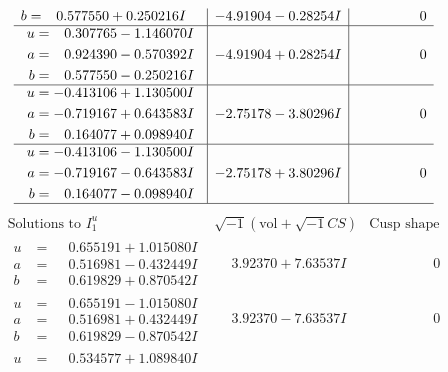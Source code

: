\documentclass[1p]{elsarticle_modified}
\theoremstyle{definition}
\newcommand{\I}{\sqrt{-1}}
\begin{document}
$$\begin{array}{c|c|c}
\begin{aligned}
b &= \phantom{-}0.577550 + 0.250216 I\end{aligned}
 & -4.91904 - 0.28254 I & \phantom{-0.000000 } 0 \\ \hline\begin{aligned}
u &= \phantom{-}0.307765 - 1.146070 I \\
a &= \phantom{-}0.924390 - 0.570392 I \\
b &= \phantom{-}0.577550 - 0.250216 I\end{aligned}
 & -4.91904 + 0.28254 I & \phantom{-0.000000 } 0 \\ \hline\begin{aligned}
u &= -0.413106 + 1.130500 I \\
a &= -0.719167 + 0.643583 I \\
b &= \phantom{-}0.164077 + 0.098940 I\end{aligned}
 & -2.75178 - 3.80296 I & \phantom{-0.000000 } 0 \\ \hline\begin{aligned}
u &= -0.413106 - 1.130500 I \\
a &= -0.719167 - 0.643583 I \\
b &= \phantom{-}0.164077 - 0.098940 I\end{aligned}
 & -2.75178 + 3.80296 I & \phantom{-0.000000 } 0\\
 \hline 
 \end{array}$$\newpage$$\begin{array}{c|c|c}  
\text{Solutions to }I^u_{1}& \I (\text{vol} + \sqrt{-1}CS) & \text{Cusp shape}\\
 \hline 
\begin{aligned}
u &= \phantom{-}0.655191 + 1.015080 I \\
a &= \phantom{-}0.516981 - 0.432449 I \\
b &= \phantom{-}0.619829 + 0.870542 I\end{aligned}
 & \phantom{-}3.92370 + 7.63537 I & \phantom{-0.000000 } 0 \\ \hline\begin{aligned}
u &= \phantom{-}0.655191 - 1.015080 I \\
a &= \phantom{-}0.516981 + 0.432449 I \\
b &= \phantom{-}0.619829 - 0.870542 I\end{aligned}
 & \phantom{-}3.92370 - 7.63537 I & \phantom{-0.000000 } 0 \\ \hline\begin{aligned}
u &= \phantom{-}0.534577 + 1.089840 I \\

\end{aligned}
\end{array}$$
\end{document}
